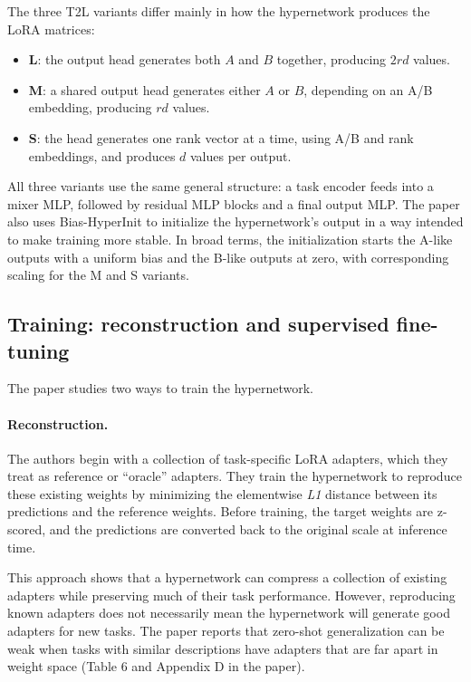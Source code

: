 \documentclass{article}
\begin{document}
The three T2L variants differ mainly in how the hypernetwork produces the LoRA matrices:

\begin{itemize}
  \item \textbf{L}: the output head generates both $A$ and $B$ together, producing $2rd$ values.
  \item \textbf{M}: a shared output head generates either $A$ or $B$, depending on an A/B embedding, producing $rd$ values.
  \item \textbf{S}: the head generates one rank vector at a time, using A/B and rank embeddings, and produces $d$ values per output.
\end{itemize}

All three variants use the same general structure: a task encoder feeds into a mixer MLP, followed by residual MLP blocks and a final output MLP. The paper also uses Bias-HyperInit \cite{beck2023hyper} to initialize the hypernetwork's output in a way intended to make training more stable. In broad terms, the initialization starts the A-like outputs with a uniform bias and the B-like outputs at zero, with corresponding scaling for the M and S variants.

\subsection{Training: reconstruction and supervised fine-tuning}

The paper studies two ways to train the hypernetwork.

\paragraph{Reconstruction.}
The authors begin with a collection of task-specific LoRA adapters, which they treat as reference or ``oracle'' adapters. They train the hypernetwork to reproduce these existing weights by minimizing the elementwise \textit{L1} distance between its predictions and the reference weights. Before training, the target weights are z-scored, and the predictions are converted back to the original scale at inference time.

This approach shows that a hypernetwork can compress a collection of existing adapters while preserving much of their task performance. However, reproducing known adapters does not necessarily mean the hypernetwork will generate good adapters for new tasks. The paper reports that zero-shot generalization can be weak when tasks with similar descriptions have adapters that are far apart in weight space (Table 6 and Appendix D in the paper).
\end{document}
